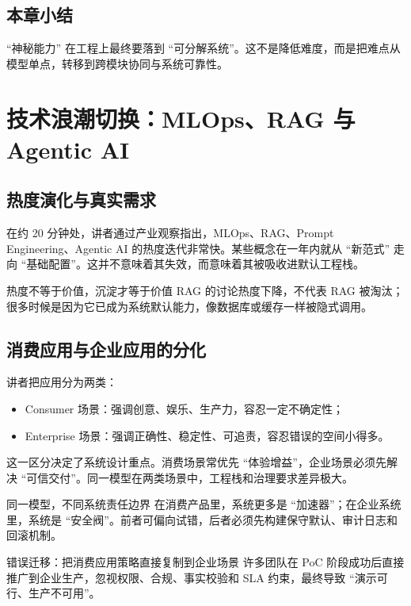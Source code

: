 \documentclass[a4paper]{article}
\begin{document}
\subsection{本章小结}
``神秘能力'' 在工程上最终要落到 ``可分解系统''。这不是降低难度，而是把难点从模型单点，转移到跨模块协同与系统可靠性。

\section{技术浪潮切换：MLOps、RAG 与 Agentic AI}

\subsection{热度演化与真实需求}
在约 20 分钟处，讲者通过产业观察指出，MLOps、RAG、Prompt Engineering、Agentic AI 的热度迭代非常快。某些概念在一年内就从 ``新范式'' 走向 ``基础配置''。这并不意味着其失效，而意味着其被吸收进默认工程栈。

\begin{importantbox}{热度不等于价值，沉淀才等于价值}
RAG 的讨论热度下降，不代表 RAG 被淘汰；很多时候是因为它已成为系统默认能力，像数据库或缓存一样被隐式调用。
\end{importantbox}

\subsection{消费应用与企业应用的分化}
讲者把应用分为两类：
\begin{itemize}
    \item Consumer 场景：强调创意、娱乐、生产力，容忍一定不确定性；
    \item Enterprise 场景：强调正确性、稳定性、可追责，容忍错误的空间小得多。
\end{itemize}

这一区分决定了系统设计重点。消费场景常优先 ``体验增益''，企业场景必须先解决 ``可信交付''。同一模型在两类场景中，工程栈和治理要求差异极大。

\begin{knowledgebox}{同一模型，不同系统责任边界}
在消费产品里，系统更多是 ``加速器''；在企业系统里，系统是 ``安全阀''。前者可偏向试错，后者必须先构建保守默认、审计日志和回滚机制。
\end{knowledgebox}

\begin{warningbox}{错误迁移：把消费应用策略直接复制到企业场景}
许多团队在 PoC 阶段成功后直接推广到企业生产，忽视权限、合规、事实校验和 SLA 约束，最终导致 ``演示可行、生产不可用''。
\end{warningbox}
\end{document}
